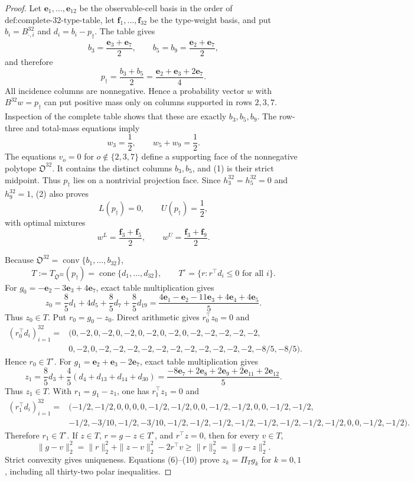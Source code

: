 \documentclass{article}
\begin{document}
\begin{proof}
Let \(\mathbf e_1,\ldots,\mathbf e_{12}\) be the observable-cell basis in the order of \(\text{def:complete-32-type-table}\), let \(\mathbf f_1,\ldots,\mathbf f_{32}\) be the type-weight basis, and put \(b_i=B^{32}_{\cdot,i}\) and \(d_i=b_i-p_\dagger\).  The table gives
\[
b_3=\frac{\mathbf e_3+\mathbf e_7}{2},
\qquad
b_5=b_9=\frac{\mathbf e_2+\mathbf e_7}{2},
\]
and therefore
\[
p_\dagger=\frac{b_3+b_5}{2}
=\frac{\mathbf e_2+\mathbf e_3+2\mathbf e_7}{4}.
\tag{1}
\]
All incidence columns are nonnegative.  Hence a probability vector \(w\) with \(B^{32}w=p_\dagger\) can put positive mass only on columns supported in rows \(2,3,7\).  Inspection of the complete table shows that these are exactly \(b_3,b_5,b_9\).  The row-three and total-mass equations imply
\[
w_3=\frac12,
\qquad
w_5+w_9=\frac12.
\tag{2}
\]
The equations \(v_o=0\) for \(o\notin\{2,3,7\}\) define a supporting face of the nonnegative polytope \(\mathfrak O^{32}\).  It contains the distinct columns \(b_3,b_5\), and (1) is their strict midpoint.  Thus \(p_\dagger\) lies on a nontrivial projection face.  Since \(h^{32}_3=h^{32}_5=0\) and \(h^{32}_9=1\), (2) also proves
\[
L(p_\dagger)=0,
\qquad
U(p_\dagger)=\frac12,
\tag{3}
\]
with optimal mixtures
\[
w^L=\frac{\mathbf f_3+\mathbf f_5}{2},
\qquad
w^U=\frac{\mathbf f_3+\mathbf f_9}{2}.
\tag{4}
\]

Because \(\mathfrak O^{32}=\operatorname{conv}\{b_1,\ldots,b_{32}\}\),
\[
T:=T_{\mathfrak O^{32}}(p_\dagger)
=\operatorname{cone}\{d_1,\ldots,d_{32}\},
\qquad
T^\circ=\{r:r^{\top}d_i\leq0\text{ for all }i\}.
\tag{5}
\]
For \(g_0=-\mathbf e_2-3\mathbf e_3+4\mathbf e_7\), exact table multiplication gives
\[
z_0=\frac85d_1+4d_5+\frac85d_7+\frac85d_{19}
=\frac{4\mathbf e_1-\mathbf e_2-11\mathbf e_3+4\mathbf e_4+4\mathbf e_5}{5}.
\tag{6}
\]
Thus \(z_0\in T\).  Put \(r_0=g_0-z_0\).  Direct arithmetic gives \(r_0^{\top}z_0=0\) and
\[
\begin{aligned}
(r_0^{\top}d_i)_{i=1}^{32}={}&(0,-2,0,-2,0,-2,0,-2,
0,-2,0,-2,-2,-2,-2,-2,\\
&0,-2,0,-2,-2,-2,-2,-2,-2,-2,-2,-2,-2,-2,-8/5,-8/5).
\end{aligned}
\tag{7}
\]
Hence \(r_0\in T^\circ\).  For \(g_1=\mathbf e_2+\mathbf e_3-2\mathbf e_7\), exact table multiplication gives
\[
z_1=\frac85d_3+\frac45(d_4+d_{13}+d_{14}+d_{30})
=\frac{-8\mathbf e_7+2\mathbf e_8+2\mathbf e_9+2\mathbf e_{11}+2\mathbf e_{12}}5.
\tag{8}
\]
Thus \(z_1\in T\).  With \(r_1=g_1-z_1\), one has \(r_1^{\top}z_1=0\) and
\[
\begin{aligned}
(r_1^{\top}d_i)_{i=1}^{32}={}&(-1/2,-1/2,0,0,0,0,-1/2,-1/2,
0,0,-1/2,-1/2,0,0,-1/2,-1/2,\\
&-1/2,-3/10,-1/2,-3/10,-1/2,-1/2,-1/2,-1/2,
-1/2,-1/2,-1/2,-1/2,0,0,-1/2,-1/2).
\end{aligned}
\tag{9}
\]
Therefore \(r_1\in T^\circ\).  If \(z\in T\), \(r=g-z\in T^\circ\), and \(r^{\top}z=0\), then for every \(v\in T\),
\[
\|g-v\|_2^2
=\|r\|_2^2+\|z-v\|_2^2-2r^{\top}v
\geq\|r\|_2^2
=\|g-z\|_2^2.
\tag{10}
\]
Strict convexity gives uniqueness.  Equations (6)--(10) prove \(z_k=\Pi_Tg_k\) for \(k=0,1\), including all thirty-two polar inequalities.


\end{proof}
\end{document}
